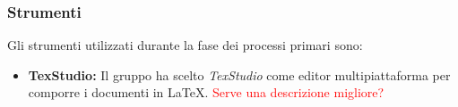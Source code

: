 \subsubsection{Strumenti}
Gli strumenti utilizzati durante la fase dei processi primari sono:
\begin{itemize}
	\item \textbf{TexStudio:}
	\newline Il gruppo ha scelto \emph{TexStudio} come editor multipiattaforma per comporre i documenti in \LaTeX. \textcolor{red}{Serve una descrizione migliore?}
\end{itemize}	


